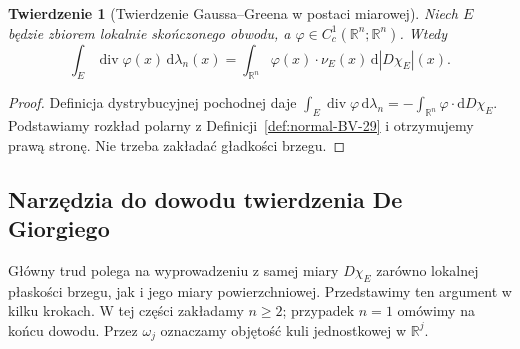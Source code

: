 \documentclass[11pt,a4paper,oneside]{book}
\numberwithin{equation}{chapter}
\theoremstyle{plain}
\newtheorem{twierdzenie}{Twierdzenie}[chapter]
\theoremstyle{definition}
\theoremstyle{remark}
\begin{document}
\begin{twierdzenie}[Twierdzenie Gaussa--Greena w postaci miarowej]
\label{thm:gauss-green-BV-29}
Niech $E$ będzie zbiorem lokalnie skończonego
obwodu, a $\varphi\in C_c^1(\mathbb R^n;\mathbb R^n)$.
Wtedy
\begin{equation}\label{eq:gauss-green-BV-29}
 \int_E\operatorname{div}\varphi(x)
 \,\mathrm d\lambda_n(x)
 =\int_{\mathbb R^n}\varphi(x)\cdot\nu_E(x)
 \,\mathrm d|D\chi_E|(x).
\end{equation}
\end{twierdzenie}
\begin{proof}
Definicja dystrybucyjnej pochodnej daje
$\int_E\operatorname{div}\varphi\,\mathrm d\lambda_n=-\int_{\mathbb R^n}\varphi\cdot\mathrm dD\chi_E$.
Podstawiamy rozkład polarny z
Definicji~\ref{def:normal-BV-29} i otrzymujemy
prawą stronę. Nie trzeba zakładać gładkości brzegu.
\end{proof}

\subsection*{Narzędzia do dowodu twierdzenia De Giorgiego}
Główny trud polega na wyprowadzeniu z samej miary $D\chi_E$
zarówno lokalnej płaskości brzegu, jak i jego miary powierzchniowej.
Przedstawimy ten argument w kilku krokach. W tej części zakładamy
$n\ge2$; przypadek $n=1$ omówimy na końcu dowodu.
Przez $\omega_j$ oznaczamy objętość kuli jednostkowej
w $\mathbb R^j$.
\end{document}
